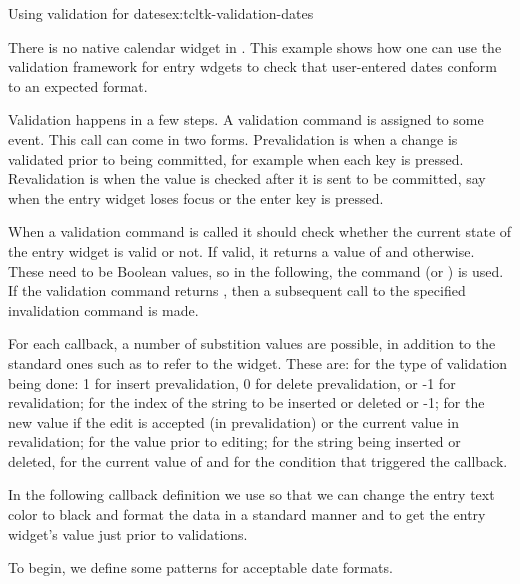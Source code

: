 \begin{example}{Using validation for dates}{ex:tcltk-validation-dates}



There is no native calendar widget in . This example shows how one can use the validation framework for entry wdgets to check that user-entered dates conform to an expected format. 

Validation happens in a few steps.  A validation command is assigned
to some event. This call can come in two forms. Prevalidation is when
a change is validated prior to being committed, for example when each key
is pressed.  Revalidation is when the value is checked
after it is sent to be committed, say when the entry widget loses
focus or the enter key is pressed.

When a validation command is called it should check
whether the current state of the entry widget is valid or not. If
valid, it returns a value of  and 
otherwise. These need to be \TCL\/ Boolean values, so in the following,
the command  (or ) is used. If
the validation command returns , then a subsequent call to
the specified invalidation command is made.

For each callback, a number of substition values are possible, in
addition to the standard ones such as  to refer to the
widget. These are:  for the type of validation being done: 1
for insert prevalidation, 0 for delete prevalidation, or -1 for
revalidation;  for the index of the string to be inserted or
deleted or -1;  for the new value if the edit is accepted (in
prevalidation) or the current value in revalidation;  for the
value prior to editing;  for the string being inserted or
deleted,  for the current value of  and
 for the condition that triggered the callback.

In the following callback definition we use  so that we can change the entry text color to black and format the data in a standard manner and  to get the entry widget's value just prior to validations.


To begin,  we define some patterns for acceptable date formats.
\begin{Schunk}
\end{Schunk}


\end{example}

